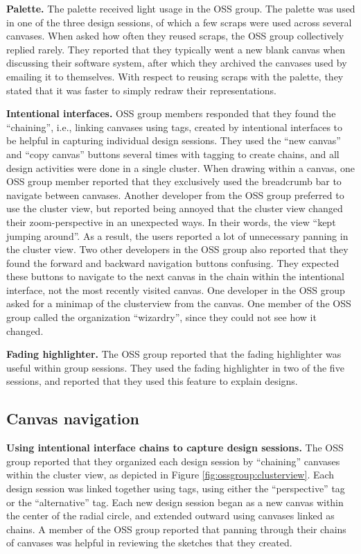 \textbf{Palette.} The palette received light usage in the OSS group. The palette was used in one of the three design sessions, of which a few scraps were used across several canvases. When asked how often they reused scraps, the OSS group collectively replied rarely. They reported that they typically went a new blank canvas when discussing their software system, after which they archived the canvases used by emailing it to themselves. With respect to reusing scraps with the palette, they stated that it was faster to simply redraw their representations.

\textbf{Intentional interfaces.} OSS group members responded that they found the ``chaining'', i.e., linking canvases using tags, created by intentional interfaces to be helpful in capturing individual design sessions. They used the ``new canvas'' and ``copy canvas'' buttons several times with tagging to create chains, and all design activities were done in a single cluster. When drawing within a canvas, one OSS group member reported that they exclusively used the breadcrumb bar to navigate between canvases. Another developer from the OSS group preferred to use the cluster view, but reported being annoyed that the cluster view changed their zoom-perspective in an unexpected ways. In their words, the view ``kept jumping around''. As a result, the users reported a lot of unnecessary panning in the cluster view. Two other developers in the OSS group also reported that they found the forward and backward navigation buttons confusing. They expected these buttons to navigate to the next canvas in the chain within the intentional interface, not the most recently visited canvas. One developer in the OSS group asked for a minimap of the clusterview from the canvas. One member of the OSS group called the organization ``wizardry'', since they could not see how it changed.

\textbf{Fading highlighter.} The OSS group reported that the fading highlighter was useful within group sessions. They used the fading highlighter in two of the five sessions, and reported that they used this feature to explain designs.

\subsection{Canvas navigation}

\textbf{Using intentional interface chains to capture design sessions.} The OSS group reported that they organized each design session by ``chaining'' canvases within the cluster view, as depicted in Figure \ref{fig:ossgroup:clusterview}. Each design session was linked together using tags, using either the ``perspective'' tag or the ``alternative'' tag. Each new design session began as a new canvas within the center of the radial circle, and extended outward using canvases linked as chains. A member of the OSS group reported that panning through their chains of canvases was helpful in reviewing the sketches that they created.

